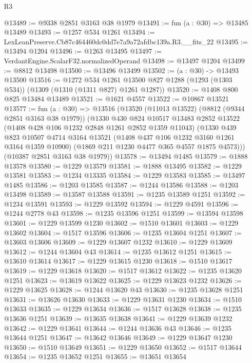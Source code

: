 \begin{lexlean}{R3}
\begin{coremodule}
@13489 := @9338 @2851 @3163 @38 @1979
@13491 := fun (a : @30) => @13485 @13489
@13493 := @1257 @534 @1261
@13494 := LexLeanPreserve.Cb87c464460dc0dd7e7a9a72afdbc139a.R3.__fits_22
@13495 := @13494 @1204
@13496 := @1263 @13495
@13497 := VerdantEngine.ScalarF32.normalizedOperand
@13498 := @13497 @1204
@13499 := @8812 @13498
@13500 := @13496 @13499
@13502 := (a : @30) -> @13493 @13500
@13516 := @1272
    @534
    @1261
    @13500
    @827
    @1288
    (@1293 (@1303 @534))
    (@1309 (@1310 (@1311 @827) @1261 @1287))
@13520 := @1408 @800 @825 @13484 @13489
@13521 := @1621 @4557
@13522 := @10867 @13521
@13577 := fun (a : @30) =>
  @13516
    (@13520
      (@11013 @13522)
      (@8812 (@9344 @2851 @3163 @38 @1979))
      (@1330
        @430
        @824
        @10517
        @13483
        @2852
        @13522
        (@1408 @428 @106 @1232 @2848 @1261 @2852 @1359 @11043)
        (@1330
          @439
          @823
          @10507
          @4714
          @3164
          @13521
          (@1408 @437 @106 @1232 @3160 @1261 @3164 @1359 @10900)
          (@1869 @211 @1230 @4477 @365 @4557 @1875 @4573)))
      (@10387 @2851 @3163 @38 @1979))
@13578 := @13494 @1485
@13579 := @1888 @13578
@13580 := @1229 @13579
@13581 := @1888 @13495
@13582 := @1229 @13581
@13583 := @1234 @13335
@13584 := @1229 @13583
@13585 := @13497 @1485
@13586 := @1203 @13585
@13587 := @1244 @13586
@13588 := @1203 @13498
@13589 := @13587 @13588
@13591 := @1235 @13589 @1251
@13592 := @1234 @13591
@13593 := @1229 @13592
@13594 := @1229 @4591
@13596 := @1244 @2778 @43
@13598 := @1235 @13596 @1251
@13599 := @13594 @13598
@13601 := @1229 @13599 @1230
@13602 := @1510 @13601
@13603 := @1229 @13602
@13604 := @1517 @13596
@13606 := @1235 @13604 @1251
@13607 := @13603 @13606
@13609 := @1229 @13607 @1232
@13610 := @1229 @13609
@13612 := @1244 @13604 @43
@13614 := @1235 @13612 @1251
@13615 := @13610 @13614
@13617 := @1229 @13615 @1230
@13618 := @1510 @13617
@13619 := @1229 @13618
@13620 := @1517 @13612
@13622 := @1235 @13620 @1251
@13623 := @13619 @13622
@13625 := @1229 @13623 @1232
@13626 := @1229 @13625
@13628 := @1244 @13620 @43
@13630 := @1235 @13628 @1251
@13631 := @13626 @13630
@13633 := @1229 @13631 @1230
@13634 := @1510 @13633
@13635 := @1229 @13634
@13636 := @1517 @13628
@13638 := @1235 @13636 @1251
@13639 := @13635 @13638
@13641 := @1229 @13639 @1232
@13642 := @1229 @13641
@13644 := @1244 @13636 @43
@13646 := @1235 @13644 @1251
@13647 := @13642 @13646
@13649 := @1229 @13647 @1230
@13650 := @1510 @13649
@13651 := @1229 @13650
@13652 := @1517 @13644
@13654 := @1235 @13652 @1251
@13655 := @13651 @13654

\end{coremodule}
\end{lexlean}
